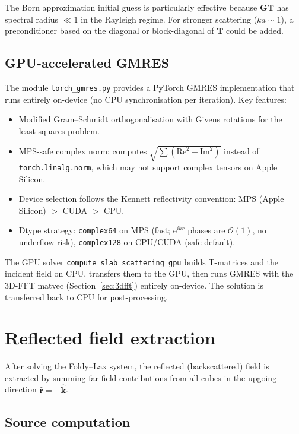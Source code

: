 \documentclass[11pt,a4paper]{article}
\newcommand{\order}{\mathcal{O}}
\newcommand{\bG}{\bm{G}}
\newcommand{\bT}{\bm{T}}
\newcommand{\hk}{\hat{\bm{k}}}
\newcommand{\hr}{\hat{\bm{r}}}
\newcommand{\ee}{\mathrm{e}}
\begin{document}
The Born approximation initial guess is particularly effective
because $\bG\bT$ has spectral radius $\ll 1$ in the Rayleigh
regime.  For stronger scattering ($ka \sim 1$), a preconditioner
based on the diagonal or block-diagonal of $\bT$ could be added.

\subsection{GPU-accelerated GMRES}

The module \texttt{torch\_gmres.py} provides a PyTorch GMRES
implementation that runs entirely on-device (no CPU synchronisation
per iteration).  Key features:
\begin{itemize}[nosep]
  \item Modified Gram--Schmidt orthogonalisation with Givens
    rotations for the least-squares problem.
  \item MPS-safe complex norm: computes
    $\sqrt{\sum(\mathrm{Re}^2 + \mathrm{Im}^2)}$ instead of
    \texttt{torch.linalg.norm}, which may not support complex
    tensors on Apple Silicon.
  \item Device selection follows the Kennett reflectivity
    convention: MPS (Apple Silicon) $>$ CUDA $>$ CPU.
  \item Dtype strategy: \texttt{complex64} on MPS (fast;
    $\ee^{ikr}$ phases are $\order(1)$, no underflow risk),
    \texttt{complex128} on CPU/CUDA (safe default).
\end{itemize}

The GPU solver \texttt{compute\_slab\_scattering\_gpu} builds
T-matrices and the incident field on CPU, transfers them to the
GPU, then runs GMRES with the 3D-FFT matvec
(Section~\ref{sec:3dfft}) entirely on-device.  The solution is
transferred back to CPU for post-processing.

\section{Reflected field extraction}
\label{sec:reflected}

After solving the Foldy--Lax system, the reflected (backscattered)
field is extracted by summing far-field contributions from all cubes
in the upgoing direction $\hr = -\hk$.

\subsection{Source computation}
\end{document}

